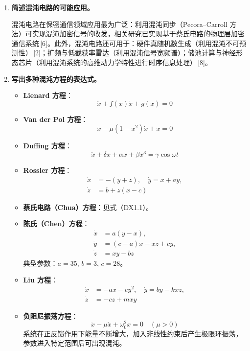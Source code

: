 \documentclass[a4paper,8pt,twocolumn]{article}
\begin{document}
\begin{enumerate}
  \item \textbf{简述混沌电路的可能应用。}

  混沌电路在保密通信领域应用最为广泛：利用混沌同步（Pecora--Carroll 方法）可实现混沌加密信号的收发，相关研究已实现基于蔡氏电路的物理层加密通信系统\,[6]。此外，混沌电路还可用于：硬件真随机数生成（利用混沌不可预测性）\,[2]；扩频与低截获率雷达（利用混沌信号宽频谱）；储池计算与神经形态芯片（利用混沌系统的高维动力学特性进行时序信息处理）\,[8]。

  \item \textbf{写出多种混沌方程的表达式。}

  \begin{itemize}
    \item \textbf{Lienard 方程}：
    \[\ddot{x} + f(x)\dot{x} + g(x) = 0\]

    \item \textbf{Van der Pol 方程}：
    \[\ddot{x} - \mu(1-x^2)\dot{x} + x = 0\]

    \item \textbf{Duffing 方程}：
    \[\ddot{x}+\delta\dot{x}+\alpha x+\beta x^3 = \gamma\cos\omega t\]

    \item \textbf{Rossler 方程}：
    \begin{align*}
      \dot{x}&=-(y+z),\quad\dot{y}=x+ay,\\
      \dot{z}&=b+z(x-c)
    \end{align*}

    \item \textbf{蔡氏电路（Chua）方程}：见式（DX1.1）。

    \item \textbf{陈氏（Chen）方程}：
    \begin{align*}
      \dot{x}&=a(y-x),\\
      \dot{y}&=(c-a)x-xz+cy,\\
      \dot{z}&=xy-bz
    \end{align*}
    典型参数：$a=35,\,b=3,\,c=28$。

    \item \textbf{Liu 方程}：
    \begin{align*}
      \dot{x}&=-ax-ey^2,\quad\dot{y}=by-kxz,\\
      \dot{z}&=-cz+mxy
    \end{align*}

    \item \textbf{负阻尼振荡方程}：
    \[\ddot{x}-\mu\dot{x}+\omega_0^2 x = 0\quad(\mu>0)\]
    系统在正反馈作用下能量不断增大，加入非线性约束后产生极限环振荡，参数进入特定范围后可出现混沌。
  \end{itemize}
\end{enumerate}
\end{document}
